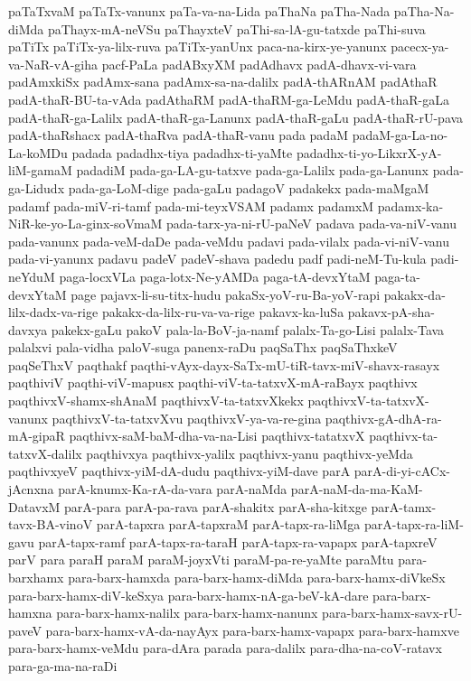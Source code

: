 {paTaTxvaM
paTaTx-vanunx
paTa-va-na-Lida
paThaNa
paTha-Nada
paTha-Na-diMda
paThayx-mA-neVSu
paThayxteV
paThi-sa-lA-gu-tatxde
paThi-suva
paTiTx
paTiTx-ya-lilx-ruva
paTiTx-yanUnx
paca-na-kirx-ye-yanunx
pacecx-ya-va-NaR-vA-giha
pacf-PaLa
padABxyXM
padAdhavx
padA-dhavx-vi-vara
padAmxkiSx
padAmx-sana
padAmx-sa-na-dalilx
padA-thARnAM
padAthaR
padA-thaR-BU-ta-vAda
padAthaRM
padA-thaRM-ga-LeMdu
padA-thaR-gaLa
padA-thaR-ga-Lalilx
padA-thaR-ga-Lanunx
padA-thaR-gaLu
padA-thaR-rU-pava
padA-thaRshacx
padA-thaRva
padA-thaR-vanu
pada
padaM
padaM-ga-La-no-La-koMDu
padada
padadhx-tiya
padadhx-ti-yaMte
padadhx-ti-yo-LikxrX-yA-liM-gamaM
padadiM
pada-ga-LA-gu-tatxve
pada-ga-Lalilx
pada-ga-Lanunx
pada-ga-Lidudx
pada-ga-LoM-dige
pada-gaLu
padagoV
padakekx
pada-maMgaM
padamf
pada-miV-ri-tamf
pada-mi-teyxVSAM
padamx
padamxM
padamx-ka-NiR-ke-yo-La-ginx-soVmaM
pada-tarx-ya-ni-rU-paNeV
padava
pada-va-niV-vanu
pada-vanunx
pada-veM-daDe
pada-veMdu
padavi
pada-vilalx
pada-vi-niV-vanu
pada-vi-yanunx
padavu
padeV
padeV-shava
padedu
padf
padi-neM-Tu-kula
padi-neYduM
paga-locxVLa
paga-lotx-Ne-yAMDa
paga-tA-devxYtaM
paga-ta-devxYtaM
page
pajavx-li-su-titx-hudu
pakaSx-yoV-ru-Ba-yoV-rapi
pakakx-da-lilx-dadx-va-rige
pakakx-da-lilx-ru-va-va-rige
pakavx-ka-luSa
pakavx-pA-sha-davxya
pakekx-gaLu
pakoV
pala-la-BoV-ja-namf
palalx-Ta-go-Lisi
palalx-Tava
palalxvi
pala-vidha
paloV-suga
panenx-raDu
paqSaThx
paqSaThxkeV
paqSeThxV
paqthakf
paqthi-vAyx-dayx-SaTx-mU-tiR-tavx-miV-shavx-rasayx
paqthiviV
paqthi-viV-mapusx
paqthi-viV-ta-tatxvX-mA-raBayx
paqthivx
paqthivxV-shamx-shAnaM
paqthivxV-ta-tatxvXkekx
paqthivxV-ta-tatxvX-vanunx
paqthivxV-ta-tatxvXvu
paqthivxV-ya-va-re-gina
paqthivx-gA-dhA-ra-mA-gipaR
paqthivx-saM-baM-dha-va-na-Lisi
paqthivx-tatatxvX
paqthivx-ta-tatxvX-dalilx
paqthivxya
paqthivx-yalilx
paqthivx-yanu
paqthivx-yeMda
paqthivxyeV
paqthivx-yiM-dA-dudu
paqthivx-yiM-dave
parA
parA-di-yi-cACx-jAcnxna
parA-knumx-Ka-rA-da-vara
parA-naMda
parA-naM-da-ma-KaM-DatavxM
parA-para
parA-pa-rava
parA-shakitx
parA-sha-kitxge
parA-tamx-tavx-BA-vinoV
parA-tapxra
parA-tapxraM
parA-tapx-ra-liMga
parA-tapx-ra-liM-gavu
parA-tapx-ramf
parA-tapx-ra-taraH
parA-tapx-ra-vapapx
parA-tapxreV
parV
para
paraH
paraM
paraM-joyxVti
paraM-pa-re-yaMte
paraMtu
para-barxhamx
para-barx-hamxda
para-barx-hamx-diMda
para-barx-hamx-diVkeSx
para-barx-hamx-diV-keSxya
para-barx-hamx-nA-ga-beV-kA-dare
para-barx-hamxna
para-barx-hamx-nalilx
para-barx-hamx-nanunx
para-barx-hamx-savx-rU-paveV
para-barx-hamx-vA-da-nayAyx
para-barx-hamx-vapapx
para-barx-hamxve
para-barx-hamx-veMdu
para-dAra
parada
para-dalilx
para-dha-na-coV-ratavx
para-ga-ma-na-raDi
}
